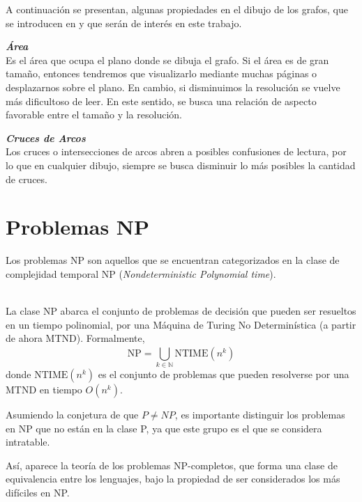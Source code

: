 A continuación se presentan, algunas propiedades en el dibujo de los grafos, que se introducen en  \cite{nishizeki2004planar} y que serán de interés en este trabajo.\\

\begin{property}{\bf\em  Área}\\
	Es el área que ocupa el plano donde se dibuja el grafo. Si el área es de gran tamaño, entonces tendremos que visualizarlo mediante muchas páginas o desplazarnos sobre el plano. En cambio, si disminuimos la resolución se vuelve más dificultoso de leer. En este sentido, se busca una relación de aspecto favorable entre el tamaño y la resolución.
\end{property}

\begin{property}{\bf\em Cruces de Arcos}\\
	Los cruces o intersecciones de arcos abren a posibles confusiones de lectura, por lo que en cualquier dibujo, siempre se busca disminuir lo más posibles la cantidad de cruces.
\end{property}



\section{Problemas NP}
\label{sec:problemas_np}
Los problemas NP son aquellos que se encuentran categorizados en la clase de complejidad temporal NP (\emph{Nondeterministic Polynomial  time}). 



\begin{definition}\cite{arora2009computational}\\
La clase NP abarca el conjunto de problemas de decisión que  pueden ser resueltos en un tiempo polinomial, por una Máquina de Turing No Determinística (a partir de ahora MTND). Formalmente,
$$\text{NP} = \bigcup_{k \in  \mathbb{N}}^{}{\text{NTIME}(n^k)}$$
donde $\text{NTIME}(n^k)$ es el conjunto de problemas que pueden resolverse por una MTND en tiempo $O(n^k)$.
\end{definition}


Asumiendo la conjetura de que $P\neq NP$, es importante distinguir  los  problemas en NP que no están en la clase P, ya que este grupo es el que se considera intratable\cite{garey1979computers}.

Así, aparece la teoría de  los  problemas NP-completos, que forma una clase de equivalencia entre los lenguajes, bajo la propiedad de  ser considerados los más difíciles en NP.

